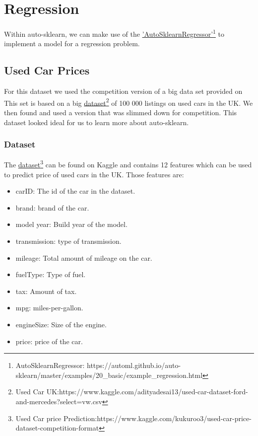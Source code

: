 \chapter{Regression}
\newcommand{\linkAutoSklearnRegressor}{https://automl.github.io/auto-sklearn/master/examples/20_basic/example_regression.html}

Within auto-sklearn, we can make use of the \href{\linkAutoSklearnRegressor}{'AutoSklearnRegressor'\footnote{AutoSklearnRegressor: \href{\linkAutoSklearnRegressor}{\linkAutoSklearnRegressor}}} to implement a model for a regression problem.

\section{Used Car Prices}
\newcommand{\kagglelinkusedcaruk}{https://www.kaggle.com/adityadesai13/used-car-dataset-ford-and-mercedes?select=vw.csv}

For this dataset we used the competition version of a big data set provided on  This set is based on a big \href{\kagglelinkusedcaruk}{dataset\footnote{Used Car UK:\href{\kagglelinkusedcaruk}{\kagglelinkusedcaruk}}} of 100 000 listings on used cars in the UK. We then found and used a version that was slimmed down for competition. This dataset looked ideal for us to learn more about auto-sklearn.

\subsection{Dataset}
\newcommand{\kagglelinkusedcar}{https://www.kaggle.com/kukuroo3/used-car-price-dataset-competition-format}

The \href{\kagglelinkusedcar}{dataset\footnote{Used Car price Prediction:\href{\kagglelinkusedcar}{\kagglelinkusedcar}}} can be found on Kaggle and contains 12 features which can be used to predict price of used cars in the UK. Those features are:

\begin{itemize}
    \item carID: The id of the car in the dataset.
    \item brand: brand of the car.
    \item model year: Build year of the model.
    \item transmission: type of transmission.
    \item mileage: Total amount of mileage on the car.
    \item fuelType: Type of fuel.
    \item tax: Amount of tax.
    \item mpg: miles-per-gallon.
    \item engineSize: Size of the engine.
    \item price: price of the car.
\end{itemize}

